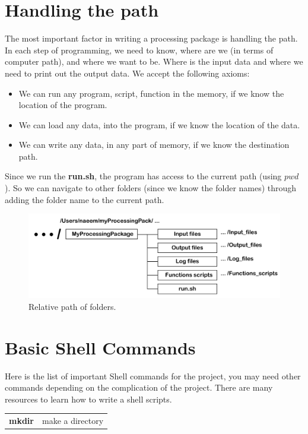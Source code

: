 \section{Handling the path}

The most important factor in writing a processing package is handling the path. In each step of programming, we need to know, where are we (in terms of computer path), and where we want to be. Where is the input data and where we need to print out the output data. We accept the following axioms:

\begin{itemize}
  \item We can run any program, script, function in the memory, if we know the location of the program.
  \item We can load any data, into the program, if we know the location of the data.
  \item We can write any data, in any part of memory, if we know the destination path. 
\end{itemize}

Since we run the \textbf{run.sh}, the program has access to the current path (using $pwd$). So we can navigate to other folders (since we know the folder names) through adding the folder name to the current path. 

\begin{figure} [ht]
\centering
\includegraphics[scale=0.6]{figures/pdf/Figure03.pdf} 
\caption{Relative path of folders.}
\label{fig:structure}
\end{figure}


\section{Basic Shell Commands}

Here is the list of important Shell commands for the project, you may need other commands depending on the complication of the project. There are many resources to learn how to write a shell scripts. 





\begin{table}[h]

\begin{tabular}{ c  m{12cm} }
 \textbf{mkdir}          & make a directory  \\ 
 \end{tabular}
\label{tab:b_k_m_param}
\end{table}